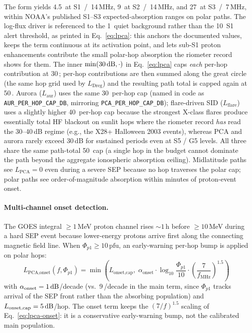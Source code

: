 \documentclass[11pt,a4paper]{article}
\newcommand{\SI}[2]{#1\,\text{#2}}
\newcommand{\dB}{\text{dB}}
\begin{document}
The form yields
\SI{4.5}{\dB} at S1~/~14\,MHz, \SI{9}{\dB} at S2~/~14\,MHz, and
\SI{27}{\dB} at S3~/~7\,MHz, within NOAA's published S1--S3
expected-absorption ranges on polar paths.  The log-flux
driver is referenced to the \SI{1}{pfu} quiet background rather
than the \SI{10}{pfu} S1 alert threshold, as printed in
Eq.~\ref{eq:lpca}: this anchors the documented values, keeps the
term continuous at its activation point, and lets sub-S1 proton
enhancements contribute the small polar-hop absorption the
riometer record shows for them.
The inner $\min(\SI{30}{\dB}, \cdot)$ in Eq.~\ref{eq:lpca} caps
\emph{each} per-hop contribution at \SI{30}{\dB}; per-hop
contributions are then summed along the great circle (the same hop
grid used by $L_{\text{Dreg}}$) and the resulting path total is
capped again at \SI{50}{\dB}.  Aurora ($L_{\text{aur}}$) uses the
same \SI{30}{\dB} per-hop cap (named in code as
\texttt{AUR\_PER\_HOP\_CAP\_DB}, mirroring
\texttt{PCA\_PER\_HOP\_CAP\_DB}); flare-driven SID
($L_{\text{flare}}$) uses a slightly higher \SI{40}{\dB} per-hop
cap because the strongest X-class flares produce essentially
total HF blackout on sunlit hops where the riometer record
\emph{has} read the 30--40\,dB regime (e.g., the X28+ Halloween
2003 events), whereas PCA and aurora rarely exceed 30\,dB for
sustained periods even at S5 / G5 levels.  All three share the
same path-total \SI{50}{\dB} cap (a single hop in the budget
cannot dominate the path beyond the aggregate ionospheric
absorption ceiling).  Midlatitude paths see $L_{\text{PCA}} =
0$ even during a severe SEP because no hop traverses the polar cap;
polar paths see order-of-magnitude absorption within minutes of
proton-event onset.

\paragraph{Multi-channel onset detection.}  The GOES integral
$\geq 1$\,MeV proton channel rises ${\sim}\SI{1}{h}$ before
$\geq 10$\,MeV during a hard SEP event because lower-energy protons
arrive first along the connecting magnetic field line.  When
$\Phi_{p1} \geq \SI{10}{pfu}$, an early-warning per-hop bump is
applied on polar hops:
\begin{equation}\label{eq:lpca-onset}
  L_{\text{PCA,onset}}(f, \Phi_{p1}) = \min\!\left(
    L_{\text{onset,cap}},\;
    \alpha_{\text{onset}} \cdot \log_{10}\!\frac{\Phi_{p1}}{10}
    \cdot \left(\frac{7}{f_{\text{MHz}}}\right)^{\!1.5}
  \right)
\end{equation}
with $\alpha_{\text{onset}} = \SI{1}{\dB}$/decade (vs.\
\SI{9}{\dB}/decade in the main term, since $\Phi_{p1}$ tracks
arrival of the SEP front rather than the absorbing population) and
$L_{\text{onset,cap}} = \SI{5}{\dB}$/hop.  The onset term keeps
the $(7/f)^{1.5}$ scaling of Eq.~\ref{eq:lpca-onset}: it is a
conservative early-warning bump, not the calibrated main
population.
\end{document}
